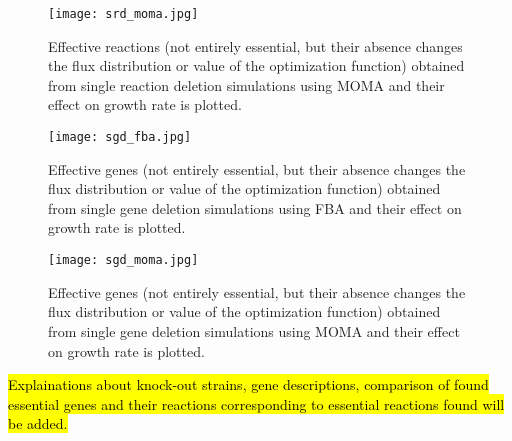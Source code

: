 \begin{figure}[H]
\begin{center}
\texttt{[image: srd\_moma.jpg]}
\end{center}
\caption[Effective reactions found from the deletion analysis using MOMA]{Effective reactions (not entirely essential, but  their absence changes the flux distribution or value of the optimization function) obtained from single reaction deletion simulations using MOMA and their effect on growth rate is plotted.}
\label{fig:srd_moma}
\end{figure}


\begin{figure}[H]
\begin{center}
\texttt{[image: sgd\_fba.jpg]}
\end{center}
\caption[Effective genes found from the deletion analysis using FBA]{Effective genes (not entirely essential, but  their absence changes the flux distribution or value of the optimization function) obtained from single gene deletion simulations using FBA and their effect on growth rate is plotted.}
\label{fig:sgd_fba}
\end{figure}

\begin{figure}[H]
\begin{center}
\texttt{[image: sgd\_moma.jpg]}
\end{center}
\caption[Effective genes found from the deletion analysis using MOMA]{Effective genes (not entirely essential, but their absence changes the flux distribution or value of the optimization function) obtained from single gene deletion simulations using MOMA and their effect on growth rate is plotted.}
\label{fig:sgd_moma}
\end{figure}
\hl{Explainations about knock-out strains, gene descriptions, comparison of found essential genes and their reactions corresponding to essential reactions found will be added.}


